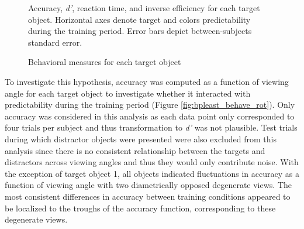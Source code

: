 \documentclass[dwyatte_dissertation.tex]{subfiles}
\begin{document}
\begin{figure}[h!]
\begin{center}
\begin{tabular}{ll}
\end{tabular}
\end{center}
\caption{Behavioral measures for each target object}{Accuracy, \textit{d'}, reaction time, and inverse efficiency for each target object. Horizontal axes denote target and colors predictability during the training period. Error bars depict between-subjects standard error.}
\label{fig:bpleast_behave_obj}
\end{figure}

To investigate this hypothesis, accuracy was computed as a function of viewing angle for each target object to investigate whether it interacted with predictability during the training period (Figure \ref{fig:bpleast_behave_rot}). Only accuracy was considered in this analysis as each data point only corresponded to four trials per subject and thus transformation to \textit{d'} was not plausible. Test trials during which distractor objects were presented were also excluded from this analysis since there is no consistent relationship between the targets and distractors across viewing angles and thus they would only contribute noise. With the exception of target object 1, all objects indicated fluctuations in accuracy as a function of viewing angle with two diametrically opposed degenerate views. The most consistent differences in accuracy between training conditions appeared to be localized to the troughs of the accuracy function, corresponding to these degenerate views.
\end{document}
